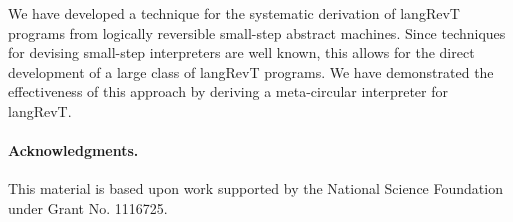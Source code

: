 \documentclass{llncs}
\begin{document}
We have developed a technique for the systematic derivation of
{{langRevT}} programs from logically reversible small-step abstract
machines. Since techniques for devising small-step interpreters are
well known, this allows for the direct development of a large class of
{{langRevT}} programs.  We have demonstrated the effectiveness of this
approach by deriving a meta-circular interpreter for {{langRevT}}.

\paragraph*{Acknowledgments.} 
This material is based upon work supported by the National Science Foundation
under Grant No. 1116725.


\begin{scriptsize}
 
  
\end{scriptsize}
\end{document}

